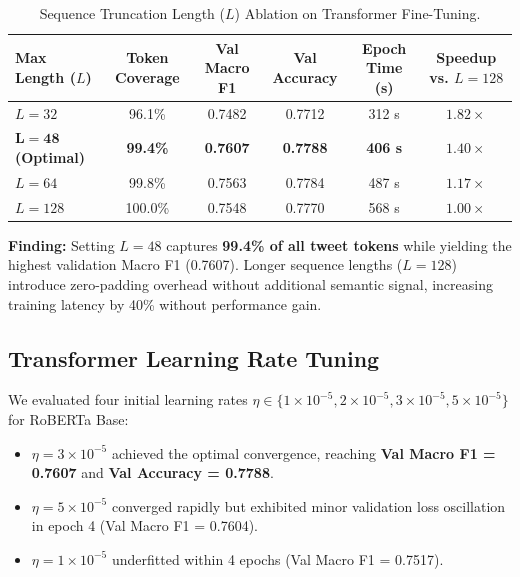 \documentclass[12pt,a4paper]{article}
\begin{document}
\begin{table}[H]
    \centering
    \small
    \caption{Sequence Truncation Length ($L$) Ablation on Transformer Fine-Tuning.}
    \label{tab:seq_len_sweep}
    \begin{tabular*}{\textwidth}{@{\extracolsep{\fill}}lccccc@{}}
        \toprule
        \textbf{Max Length ($L$)} & \textbf{Token Coverage} & \textbf{Val Macro F1} & \textbf{Val Accuracy} & \textbf{Epoch Time (s)} & \textbf{Speedup vs. $L=128$} \\
        \midrule
        $L = 32$ & 96.1\% & 0.7482 & 0.7712 & 312 s & $1.82\times$ \\
        $\mathbf{L = 48}$ \textbf{(Optimal)} & \textbf{99.4\%} & \textbf{0.7607} & \textbf{0.7788} & \textbf{406 s} & $\mathbf{1.40\times}$ \\
        $L = 64$ & 99.8\% & 0.7563 & 0.7784 & 487 s & $1.17\times$ \\
        $L = 128$ & 100.0\% & 0.7548 & 0.7770 & 568 s & $1.00\times$ \\
        \bottomrule
    \end{tabular*}
\end{table}

\textbf{Finding:} Setting $L = 48$ captures \textbf{99.4\% of all tweet tokens} while yielding the highest validation Macro F1 (0.7607). Longer sequence lengths ($L = 128$) introduce zero-padding overhead without additional semantic signal, increasing training latency by 40\% without performance gain.

\subsection{Transformer Learning Rate Tuning}
We evaluated four initial learning rates $\eta \in \{1\times 10^{-5}, 2\times 10^{-5}, 3\times 10^{-5}, 5\times 10^{-5}\}$ for RoBERTa Base:
\begin{itemize}
    \item $\eta = 3\times 10^{-5}$ achieved the optimal convergence, reaching \textbf{Val Macro F1 = 0.7607} and \textbf{Val Accuracy = 0.7788}.
    \item $\eta = 5\times 10^{-5}$ converged rapidly but exhibited minor validation loss oscillation in epoch 4 (Val Macro F1 = 0.7604).
    \item $\eta = 1\times 10^{-5}$ underfitted within 4 epochs (Val Macro F1 = 0.7517).
\end{itemize}

\end{document}
